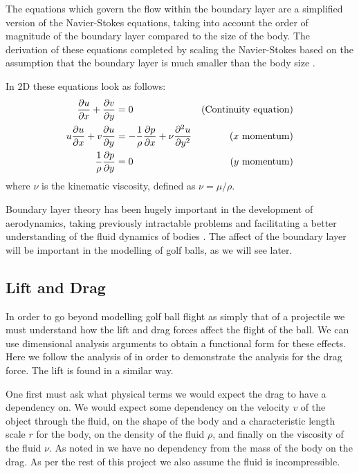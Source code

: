The equations which govern the flow within the boundary layer are a simplified version of the
Navier-Stokes equations, taking into account the order of magnitude of the boundary layer compared to
the size of the body. The derivation of these equations completed by scaling the Navier-Stokes 
based on the assumption that the boundary layer is much smaller than the body size \citet{anderson}.

In 2D these equations look as follows:
\begin{subequations}
\begin{align}
\frac{\partial u}{\partial x} + \frac{\partial v}{\partial y} &= 0 &\text{(Continuity equation)} \\
u\frac{\partial u}{\partial x} + v\frac{\partial u}{\partial y} &= -\frac{1}{\rho} \frac{\partial p}{\partial x} +
\nu \frac{\partial^2 u}{\partial y^2} &\text{($x$ momentum)} \\
\frac{1}{\rho} \frac{\partial p}{\partial y} &= 0 &\text{($y$ momentum)}
\end{align}
\end{subequations}
where $\nu$ is the kinematic viscosity, defined as $\nu = \mu / \rho$.

Boundary layer theory has been hugely important in the development of aerodynamics, taking previously
intractable problems and facilitating a better understanding of the fluid dynamics of bodies 
\citet{anderson}. The affect of the boundary layer will be important in the modelling of golf balls,
as we will see later.

\subsection{Lift and Drag} \label{sec:drag}

In order to go beyond modelling golf ball flight as simply that of a projectile we must understand 
how the lift and drag forces affect the flight of the ball. We can use dimensional analysis arguments
to obtain a functional form for these effects. Here we follow the analysis of 
\citet{jensen2013introducing} in order to demonstrate the analysis for the drag force. The lift is
found in a similar way.

One first must ask what physical terms we would expect the drag to have a dependency on. We would
expect some dependency on the velocity $v$ of the object through the fluid, on the shape of the body and
a characteristic length scale $r$ for the body, on the density of the fluid $\rho$, and finally on
the viscosity of the fluid $\nu$. As noted in \citet{jensen2013introducing} we have no dependency from
the mass of the body on the drag. As per the rest of this project we also assume the fluid is
incompressible.

